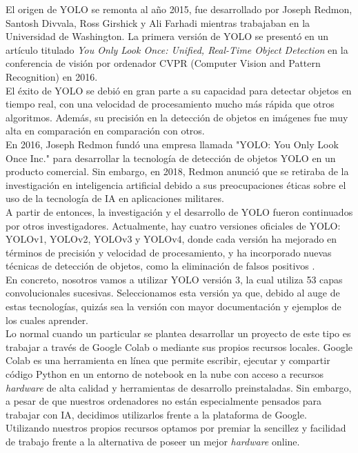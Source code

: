 El origen de YOLO se remonta al año 2015, fue desarrollado por Joseph Redmon, Santosh Divvala, Ross Girshick y Ali Farhadi mientras trabajaban en la Universidad de Washington. La primera versión de YOLO se presentó en un artículo titulado \textit{You Only Look Once: Unified, Real-Time Object Detection} en la conferencia de visión por ordenador CVPR (Computer Vision and Pattern Recognition) en 2016. \\

El éxito de YOLO se debió en gran parte a su capacidad para detectar objetos en tiempo real, con una velocidad de procesamiento mucho más rápida que otros algoritmos. Además, su precisión en la detección de objetos en imágenes fue muy alta en comparación en comparación con otros.\\

En 2016, Joseph Redmon fundó una empresa llamada "YOLO: You Only Look Once Inc." para desarrollar la tecnología de detección de objetos YOLO en un producto comercial. Sin embargo, en 2018, Redmon anunció que se retiraba de la investigación en inteligencia artificial debido a sus preocupaciones éticas sobre el uso de la tecnología de IA en aplicaciones militares.\\

A partir de entonces, la investigación y el desarrollo de YOLO fueron continuados por otros investigadores. Actualmente, hay cuatro versiones oficiales de YOLO: YOLOv1, YOLOv2, YOLOv3 y YOLOv4, donde cada versión ha mejorado en términos de precisión y velocidad de procesamiento, y ha incorporado nuevas técnicas de detección de objetos, como la eliminación de falsos positivos \cite{yolo2}.\\

En concreto, nosotros vamos a utilizar YOLO versión 3, la cual utiliza 53 capas convolucionales sucesivas. Seleccionamos esta versión ya que, debido al auge de estas tecnologías, quizás sea la versión con mayor documentación y ejemplos de los cuales aprender.\\

Lo normal cuando un particular se plantea desarrollar un proyecto de este tipo es trabajar a través de Google Colab o mediante sus propios recursos locales. Google Colab es una herramienta en línea que permite escribir, ejecutar y compartir código Python en un entorno de notebook en la nube con acceso a recursos \textit{hardware} de alta calidad y herramientas de desarrollo preinstaladas. Sin embargo, a pesar de que nuestros ordenadores no están especialmente pensados para trabajar con IA, decidimos utilizarlos frente a la plataforma de Google. Utilizando nuestros propios recursos optamos por premiar la sencillez y facilidad de trabajo frente a la alternativa de poseer un mejor \textit{hardware} online.\\

